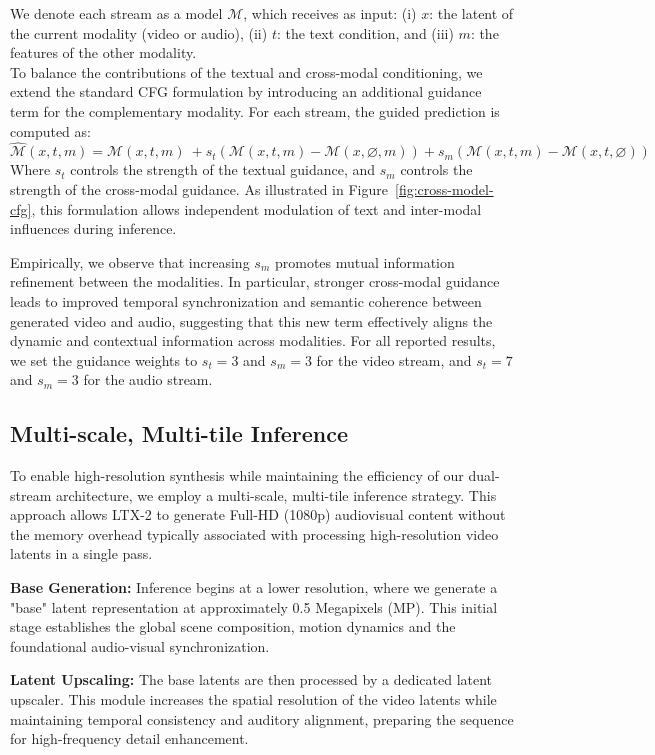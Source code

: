 \documentclass{article}
\begin{document}
We denote each stream as a model $\mathcal{M}$, which receives as input: (i) $x$: the latent of the current modality (video or audio), (ii) $t$: the text condition, and (iii) $m$: the features of the other modality.\\
To balance the contributions of the textual and cross-modal conditioning, we extend the standard CFG formulation by introducing an additional guidance term for the complementary modality.
For each stream, the guided prediction is computed as:
\[
\hat{\mathcal{M}}(x, t, m) = \mathcal{M}(x, t, m)  \
+ s_t \left( \mathcal{M}(x, t, m) - \mathcal{M}(x, \varnothing, m) \right) 
+ s_m \left( \mathcal{M}(x, t, m) - \mathcal{M}(x, t, \varnothing) \right)
\]
Where $s_t$ controls the strength of the textual guidance, and $s_m$ controls the strength of the cross-modal guidance. As illustrated in Figure~\ref{fig:cross-model-cfg}, this formulation allows independent modulation of text and inter-modal influences during inference. 

Empirically, we observe that increasing $s_m$ promotes mutual information refinement between the modalities. In particular, stronger cross-modal guidance leads to improved temporal synchronization and semantic coherence between generated video and audio, suggesting that this new term effectively aligns the dynamic and contextual information across modalities. For all reported results, we set the guidance weights to $s_t = 3$ and $s_m = 3$ for the video stream, and $s_t = 7$ and $s_m = 3$ for the audio stream.

\subsection{Multi-scale, Multi-tile Inference}

To enable high-resolution synthesis while maintaining the efficiency of our dual-stream architecture, we employ a multi-scale, multi-tile inference strategy. This approach allows LTX-2 to generate Full-HD (1080p) audiovisual content without the memory overhead typically associated with processing high-resolution video latents in a single pass.

\textbf{Base Generation:} Inference begins at a lower resolution, where we generate a "base" latent representation at approximately 0.5 Megapixels (MP). This initial stage establishes the global scene composition, motion dynamics and the foundational audio-visual synchronization.

\textbf{Latent Upscaling:} The base latents are then processed by a dedicated latent upscaler. This module increases the spatial resolution of the video latents while maintaining temporal consistency and auditory alignment, preparing the sequence for high-frequency detail enhancement.
\end{document}

